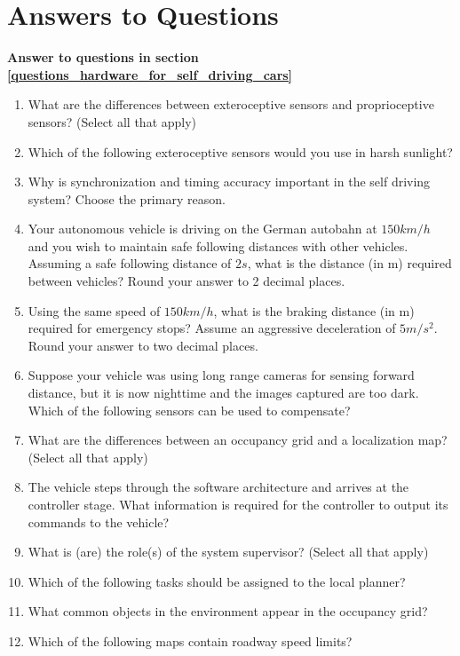 \section{Answers to Questions}
\label{answers_hardware_for_self_driving_cars}

{\textbf{Answer to questions in section \ref{questions_hardware_for_self_driving_cars}}}

\begin{enumerate}
\item What are the differences between exteroceptive sensors and proprioceptive sensors? (Select all that apply)
\item Which of the following exteroceptive sensors would you use in harsh sunlight?
\item Why is synchronization and timing accuracy important in the self driving system? Choose the primary reason.
\item Your autonomous vehicle is driving on the German autobahn at $150km/h$ and you wish to maintain safe following distances with other vehicles. 
		Assuming a safe following distance of $2s$,  what is the distance (in m) required between vehicles? Round your answer to 2 decimal places.

\item Using the same speed of $150km/h$, what is the braking distance (in m) required for emergency stops? 
	  Assume an aggressive deceleration of $5m/s^2$. Round your answer to two decimal places.
\item Suppose your vehicle was using long range cameras for sensing forward distance, 
	but it is now nighttime and the images captured are too dark. Which of the following sensors can be used to compensate?
\item What are the differences between an occupancy grid and a localization map? (Select all that apply)
\item The vehicle steps through the software architecture and arrives at the controller stage. 
		What information is required for the controller to output its commands to the vehicle?
\item What is (are) the role(s) of the system supervisor? (Select all that apply) 
\item Which of the following tasks should be assigned to the local planner?
\item What common objects in the environment appear in the occupancy grid?
\item Which of the following maps contain roadway speed limits?
\end{enumerate}

